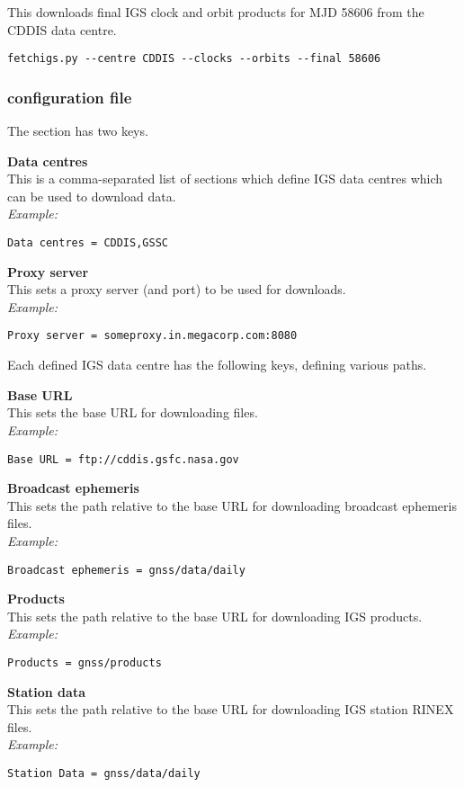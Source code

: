 This downloads final IGS clock and orbit products for MJD 58606 from the CDDIS data centre.\\
\begin{lstlisting}
fetchigs.py --centre CDDIS --clocks --orbits --final 58606
\end{lstlisting}

\subsubsection{configuration file}

The \cc{[Main]} section has two keys.

{\bfseries Data centres}\\
This is a comma-separated list of sections which define IGS data centres which can be used to download data.\\
\textit{Example:}
\begin{lstlisting}
Data centres = CDDIS,GSSC
\end{lstlisting}

{\bfseries Proxy server}\\
This sets a proxy server (and port) to be used for downloads.\\
\textit{Example:}
\begin{lstlisting}
Proxy server = someproxy.in.megacorp.com:8080
\end{lstlisting}

Each defined IGS data centre has the following keys, defining various paths.

{\bfseries Base URL}\\
This sets the base URL for downloading files.\\
\textit{Example:}
\begin{lstlisting}
Base URL = ftp://cddis.gsfc.nasa.gov
\end{lstlisting}

{\bfseries Broadcast ephemeris}\\
This sets the path relative to the base URL for downloading broadcast ephemeris files.\\
\textit{Example:}
\begin{lstlisting}
Broadcast ephemeris = gnss/data/daily
\end{lstlisting}

{\bfseries Products}\\
This sets the path relative to the base URL for downloading IGS products.\\
\textit{Example:}
\begin{lstlisting}
Products = gnss/products
\end{lstlisting}

{\bfseries Station data}\\
This sets the path relative to the base URL for downloading IGS station RINEX files. \\
\textit{Example:}
\begin{lstlisting}
Station Data = gnss/data/daily
\end{lstlisting}
